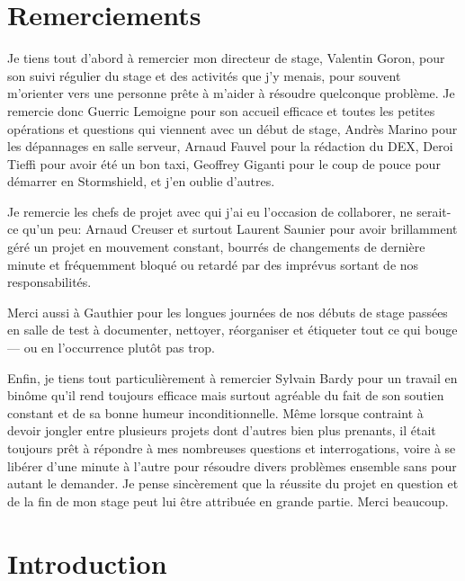 \documentclass[12pt, oneside, a4paper, titlepage]{report}
\begin{document}
\begin{titlepage}
    
\end{titlepage}

\tableofcontents




\chapter{Remerciements}%
\label{cha:ackn}

Je tiens tout d'abord à remercier mon directeur de stage, Valentin Goron, pour
son suivi régulier du stage et des activités que j'y menais, pour souvent
m'orienter vers une personne prête à m'aider à résoudre quelconque problème. Je
remercie donc Guerric Lemoigne pour son accueil efficace et toutes les petites
opérations et questions qui viennent avec un début de stage, Andrès Marino pour
les dépannages en salle serveur, Arnaud Fauvel pour la rédaction du DEX, Deroi
Tieffi pour avoir été un bon taxi, Geoffrey Giganti pour le coup de pouce pour
démarrer en Stormshield, et j'en oublie d'autres.

Je remercie les chefs de projet avec qui j'ai eu l'occasion de collaborer, ne
serait-ce qu'un peu: Arnaud Creuser et surtout Laurent Saunier pour avoir
brillamment géré un projet en mouvement constant, bourrés de changements de
dernière minute et fréquemment bloqué ou retardé par des imprévus sortant de nos
responsabilités.

Merci aussi à Gauthier pour les longues journées de nos débuts de stage passées
en salle de test à documenter, nettoyer, réorganiser et étiqueter tout ce qui
bouge --- ou en l'occurrence plutôt pas trop.

Enfin, je tiens tout particulièrement à remercier Sylvain Bardy pour un travail
en binôme qu'il rend toujours efficace mais surtout agréable du fait de son
soutien constant et de sa bonne humeur inconditionnelle. Même lorsque contraint
à devoir jongler entre plusieurs projets dont d'autres bien plus prenants, il
était toujours prêt à répondre à mes nombreuses questions et interrogations,
voire à se libérer d'une minute à l'autre pour résoudre divers problèmes
ensemble sans pour autant le demander. Je pense sincèrement que la réussite du
projet en question et de la fin de mon stage peut lui être attribuée en grande
partie. Merci beaucoup.


\chapter{Introduction}%
\label{cha:intro}
\end{document}
